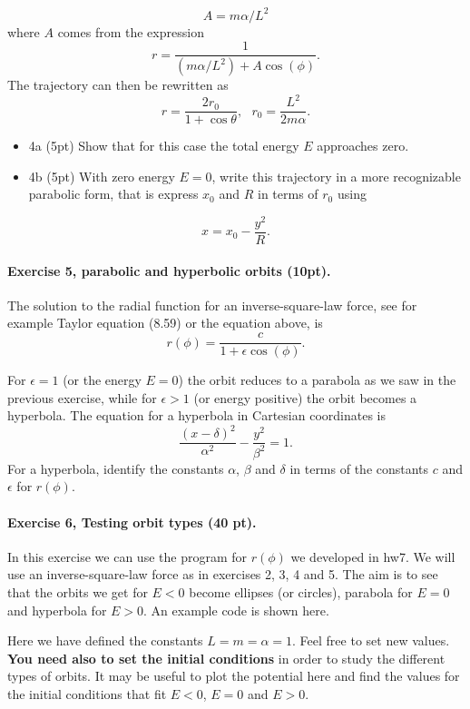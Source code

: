 \documentclass[%
oneside,                 %
final,                   %
10pt]{article}
\begin{document}
\[
A=m\alpha/L^2
\]
where $A$ comes from the expression
\[
r=\frac{1}{(m\alpha/L^2)+A\cos{(\phi)}}.
\]
The trajectory can then be rewritten as
\[
r=\frac{2r_0}{1+\cos\theta},~~~r_0=\frac{L^2}{2m\alpha}.
\]


\begin{itemize}
\item 4a (5pt) Show that for this case the total energy $E$ approaches zero.

\item 4b (5pt) With zero energy $E=0$, write this trajectory in a more recognizable parabolic form, that is express $x_0$ and $R$ in terms of $r_0$ using 
\end{itemize}

\noindent
\[
x=x_0-\frac{y^2}{R}.
\]

\paragraph{Exercise 5, parabolic and hyperbolic orbits (10pt).}
The solution to the radial function for an inverse-square-law force, see for example Taylor equation (8.59) or the equation above, is
\[
r(\phi) = \frac{c}{1+\epsilon\cos{(\phi)}}.
\]

For $\epsilon=1$ (or the energy $E=0$) the orbit reduces to a parabola as we saw in the previous exercise,
while for $\epsilon > 1$ (or energy positive) the orbit becomes a hyperbola. The equation for a hyperbola in Cartesian coordinates is
\[
\frac{(x-\delta)^2}{\alpha^2}-\frac{y^2}{\beta^2}=1.
\]
For a hyperbola, identify the constants $\alpha$, $\beta$ and $\delta$ in terms of the constants $c$ and $\epsilon$ for $r(\phi)$. 

\paragraph{Exercise 6, Testing orbit types (40 pt).}
In this exercise we can use the program for $r(\phi)$ we developed in hw7. We will use an inverse-square-law force as in exercises 2, 3, 4 and 5. The aim is to see that the orbits we get for $E<0$ become ellipses (or circles), parabola for $E=0$ and hyperbola for $E>0$.  An example code is shown here.

Here we have defined the constants $L=m=\alpha=1$. Feel free to set new values. \textbf{You need also to set the initial conditions} in order to study the different types of orbits. It may be useful to plot the potential here and find the values for the initial conditions that fit $E<0$, $E=0$ and $E>0$. 
\end{document}
